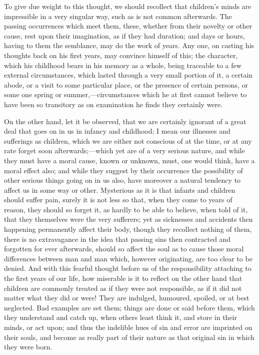 To give due weight to this thought, we should recollect that
children's minds are impressible in a very singular way, such as is
not common afterwards. The passing occurrences which meet them, these,
whether from their novelty or other cause, rest upon their
imagination, as if they had duration; and days or hours, having to
them the semblance, may do the work of years. Any one, on casting his
thoughts back on his first years, may convince himself of this; the
character, which his childhood bears in his memory as a whole, being
traceable to a few external circumstances, which lasted through a very
small portion of it, a certain abode, or a visit to some particular
place, or the presence of certain persons, or some one spring or
summer,—circumstances which he at first cannot believe to have been
so transitory as on examination he finds they certainly were.

On the other hand, let it be observed, that we are certainly
ignorant of a great deal that goes on in us in infancy and childhood;
I mean our illnesses and sufferings as children, which we are either
not conscious of at the time, or at any rate forget soon afterwards;—which
yet are of a very serious nature, and while they must have a moral
cause, known or unknown, must, one would think, have a moral effect
also; and while they suggest by their occurrence the possibility of
other serious things going on in us also, have moreover a natural
tendency to affect us in some way or other. Mysterious as it is that
infants and children should suffer pain, surely it is not less so
that, when they come to years of reason, they should so forget it, as
hardly to be able to believe, when told of it, that they themselves
were the very sufferers; yet as sicknesses and accidents then
happening permanently affect their body, though they recollect nothing
of them, there is no extravagance in the idea that passing sins then
contracted and forgotten for ever afterwards, should so affect the
soul as to cause those moral differences between man and man which,
however originating, are too clear to be denied. And with this fearful
thought before us of the responsibility attaching to the first years
of our life, how miserable is it to reflect on the other hand that
children are commonly treated as if they were not responsible, as if
it did not matter what they did or were! They are indulged, humoured,
spoiled, or at best neglected. Bad examples are set them; things are
done or said before them, which they understand and catch up, when
others least think it, and store in their minds, or act upon; and thus
the indelible hues of sin and error are imprinted on their souls, and
become as really part of their nature as that original sin in which
they were born.


